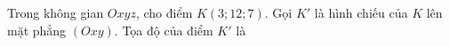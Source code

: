 \begin{ex}
Trong không gian $Oxyz$, cho điểm $K(3;12;7)$. Gọi $K'$ là hình chiếu của $K$ lên mặt phẳng $(Oxy)$. Tọa độ của điểm $K'$ là
\end{ex}
